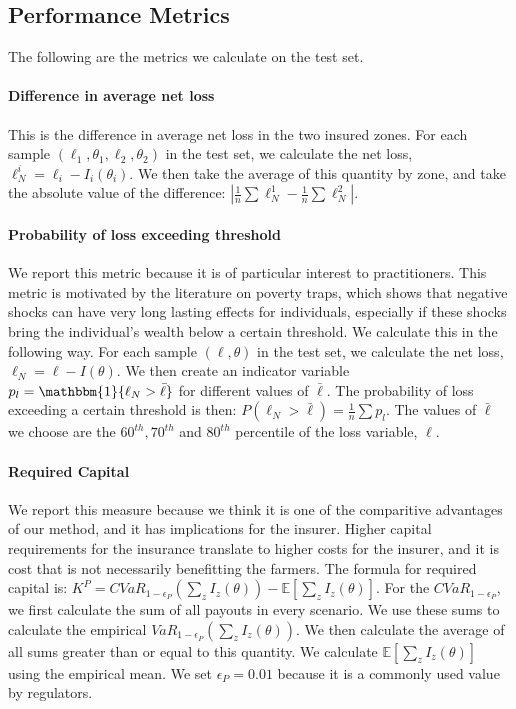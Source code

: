 \documentclass[11pt]{article}
\begin{document}
  \subsection{Performance Metrics}
    The following are the metrics we calculate on the test set. 
    \paragraph*{Difference in average net loss} This is the difference in average net loss in the two insured zones. For each sample $(\ell_1,\theta_1, \ell_2, \theta_2)$ in the test set, we calculate the net loss, $\ell^i_N =  \ell_i - I_i(\theta_i)$. We then take the average of this quantity by zone, and take the absolute value of the difference: $|\frac{1}{n}\sum \ell^1_N - \frac{1}{n}\sum \ell^2_N|$.

    \paragraph*{Probability of loss exceeding threshold} We report this metric because it is of particular interest to practitioners. This metric is motivated by the literature on poverty traps, which shows that negative shocks can have very long lasting effects for individuals, especially if these shocks bring the individual's wealth below a certain threshold. We calculate this in the following way. For each sample $(\ell,\theta)$ in the test set, we calculate the net loss, $\ell_N =  \ell - I(\theta)$. We then create an indicator variable $p_l =  \mathbbm{1}\{ \ell_N > \bar{\ell} \}$ for different values of $\bar{\ell}$. The probability of loss exceeding a certain threshold is then: $P(\ell_N > \bar{\ell}) = \frac{1}{n}\sum p_l$. The values of $\bar{\ell}$ we choose are the $60^{th}, 70^{th}$ and $80^{th}$ percentile of the loss variable, $\ell$.

    \paragraph*{Required Capital} We report this measure because we think it is one of the comparitive advantages of our method, and it has implications for the insurer. Higher capital requirements for the insurance translate to higher costs for the insurer, and it is cost that is not necessarily benefitting the farmers. The formula for required capital is: $K^P = CVaR_{1-\epsilon_P}(\sum_z I_z(\theta)) - \mathbb{E}[\sum_z I_z(\theta)]$. For the $CVaR_{1-\epsilon_P}$, we first calculate the sum of all payouts in every scenario. We use these sums to calculate the empirical $VaR_{1-\epsilon_P}(\sum_z I_z(\theta))$. We then calculate the average of all sums greater than or equal to this quantity. We calculate $\mathbb{E}[\sum_z I_z(\theta)]$ using the empirical mean. We set $\epsilon_P = 0.01$ because it is a commonly used value by regulators. 
\end{document}
